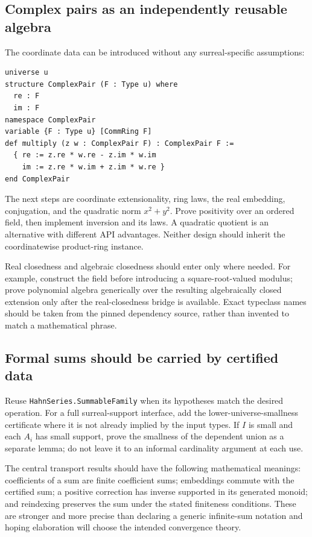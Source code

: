 \documentclass[11pt,letterpaper]{article}
\numberwithin{equation}{section}
\theoremstyle{definition}
\theoremstyle{remark}
\begin{document}
\subsection{Complex pairs as an independently reusable algebra}
The coordinate data can be introduced without any surreal-specific assumptions:
\begin{samepage}
\begin{lstlisting}
universe u
structure ComplexPair (F : Type u) where
  re : F
  im : F
namespace ComplexPair
variable {F : Type u} [CommRing F]
def multiply (z w : ComplexPair F) : ComplexPair F :=
  { re := z.re * w.re - z.im * w.im
    im := z.re * w.im + z.im * w.re }
end ComplexPair
\end{lstlisting}
\end{samepage}
The next steps are coordinate extensionality, ring laws, the real embedding, conjugation, and the quadratic norm $x^2+y^2$. Prove positivity over an ordered field, then implement inversion and its laws. A quadratic quotient is an alternative with different API advantages. Neither design should inherit the coordinatewise product-ring instance.

Real closedness and algebraic closedness should enter only where needed. For example, construct the field before introducing a square-root-valued modulus; prove polynomial algebra generically over the resulting algebraically closed extension only after the real-closedness bridge is available. Exact typeclass names should be taken from the pinned dependency source, rather than invented to match a mathematical phrase.

\subsection{Formal sums should be carried by certified data}
Reuse \texttt{HahnSeries.SummableFamily} when its hypotheses match the desired operation. For a full surreal-support interface, add the lower-universe-smallness certificate where it is not already implied by the input types. If $I$ is small and each $A_i$ has small support, prove the smallness of the dependent union as a separate lemma; do not leave it to an informal cardinality argument at each use.

The central transport results should have the following mathematical meanings: coefficients of a sum are finite coefficient sums; embeddings commute with the certified sum; a positive correction has inverse supported in its generated monoid; and reindexing preserves the sum under the stated finiteness conditions. These are stronger and more precise than declaring a generic infinite-sum notation and hoping elaboration will choose the intended convergence theory.
\end{document}
